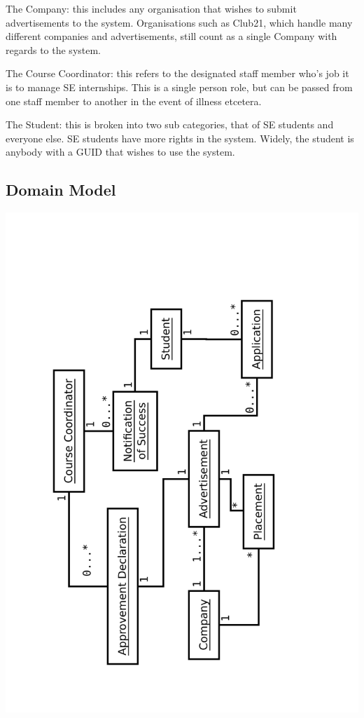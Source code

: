 \documentclass{l3deliverable}
\begin{document}
The Company: this includes any organisation that wishes to submit 
advertisements to the system. Organisations such as Club21, which handle
many different companies and advertisements, still count as a single Company
with regards to the system.

The Course Coordinator: this refers to the designated staff member who's job
it is to manage SE internships. This is a single person role, but can be 
passed from one staff member to another in the event of illness etcetera.

The Student: this is broken into two sub categories, that of SE students and
everyone else. SE students have more rights in the system. Widely, the student
is anybody with a GUID that wishes to use the system.


\subsection{Domain Model}


\includegraphics[scale=0.5,angle=-90]{Domain.pdf}
\end{document}
